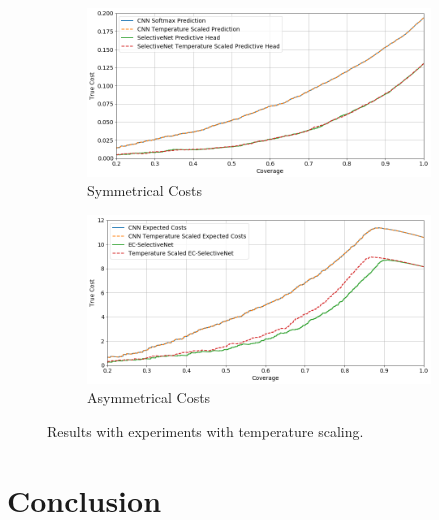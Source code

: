 \begin{figure}[h]
	\centering
	\begin{subfigure}{\textwidth}
		\centering
		\includegraphics[width=\linewidth]{images/multi-class-temp-sym.png}
		\caption{Symmetrical Costs}	
	\end{subfigure}
	\begin{subfigure}{\textwidth}
		\centering
		\includegraphics[width=\linewidth]{images/multi-class-temp-asym.png}
		\caption{Asymmetrical Costs}
	\end{subfigure}
	\caption{Results with experiments with temperature scaling.}
	\label{fig:multi-class-temp}
\end{figure}

\section{Conclusion}
\label{sec:selective_conclusion}
